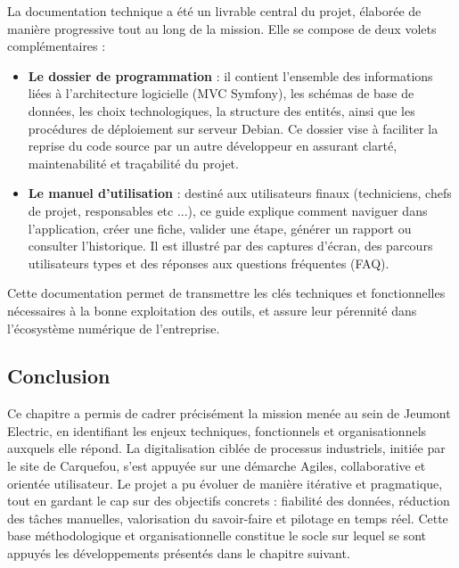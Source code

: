 \documentclass[11pt,a4paper]{article}
\begin{document}
\begin{enumerate}
La documentation technique a été un livrable central du projet, élaborée de manière progressive tout au long de la mission. Elle se compose de deux volets complémentaires :

\begin{itemize}
    \item \textbf{Le dossier de programmation} : il contient l’ensemble des informations liées à l’architecture logicielle (MVC Symfony), les schémas de base de données, les choix technologiques, la structure des entités, ainsi que les procédures de déploiement sur serveur Debian. Ce dossier vise à faciliter la reprise du code source par un autre développeur en assurant clarté, maintenabilité et traçabilité du projet.
    
    \item \textbf{Le manuel d’utilisation} : destiné aux utilisateurs finaux (techniciens, chefs de projet, responsables etc ...), ce guide explique comment naviguer dans l’application, créer une fiche, valider une étape, générer un rapport ou consulter l’historique. Il est illustré par des captures d’écran, des parcours utilisateurs types et des réponses aux questions fréquentes (FAQ).
\end{itemize}

Cette documentation permet de transmettre les clés techniques et fonctionnelles nécessaires à la bonne exploitation des outils, et assure leur pérennité dans l’écosystème numérique de l’entreprise.
\end{enumerate}


\subsection{Conclusion}

Ce chapitre a permis de cadrer précisément la mission menée au sein de Jeumont Electric, en identifiant les enjeux techniques, fonctionnels et organisationnels auxquels elle répond. La digitalisation ciblée de processus industriels, initiée par le site de Carquefou, s’est appuyée sur une démarche Agiles, collaborative et orientée utilisateur. Le projet a pu évoluer de manière itérative et pragmatique, tout en gardant le cap sur des objectifs concrets : fiabilité des données, réduction des tâches manuelles, valorisation du savoir-faire et pilotage en temps réel. Cette base méthodologique et organisationnelle constitue le socle sur lequel se sont appuyés les développements présentés dans le chapitre suivant.
\end{document}
